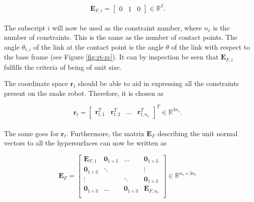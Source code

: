 \begin{equation}
    \mathbf{E}_{F,i} =
    \begin{bmatrix}
        0 & 1 & 0
    \end{bmatrix} \in \mathbb{R}^3.
\end{equation}
\\
The subscript $i$ will now be used as the constraint number, where $n_c$ is the number of constraints. This is the same as the number of contact points.
The angle $\theta_{t,i}$ of the link at the contact point is the angle $\theta$ of the link with respect to the base frame (see Figure \ref{fig:rt-rc}). It can by inspection be seen that $\mathbf{E}_{F,i}$ fulfills the criteria of being of unit size.


The coordinate space $\mathbf{r}_t$ should be able to aid in expressing all the constraints present on the snake robot. Therefore, it is chosen as 

\begin{equation}
    \mathbf{r}_t = 
    \begin{bmatrix}
        \mathbf{r}_{t,1}^T & \mathbf{r}_{t,2}^T & \dots &\mathbf{r}_{t,n_c}^T
    \end{bmatrix}^T \in \mathbb{R}^{3 n_c}.
\end{equation}
\\
The same goes for $\dot{\mathbf{r}}_t$. Furthermore, the matrix $\mathbf{E}_{F}$ describing the unit normal vectors to all the hypersurfaces can now be written as

\begin{equation}
    \mathbf{E}_F = 
    \begin{bmatrix}
        \mathbf{E}_{F,1} & \mathbf{0}_{1\times3} & \dots & \mathbf{0}_{1\times3} \\
        \mathbf{0}_{1\times3} & \ddots & & \vdots \\
        \vdots & & \ddots & \mathbf{0}_{1\times3} \\
        \mathbf{0}_{1\times3} & \dots & \mathbf{0}_{1\times3} & \mathbf{E}_{F,n_c} \\
    \end{bmatrix} \in \mathbb{R}^{n_c \times 3 n_c}
\end{equation}
\\

